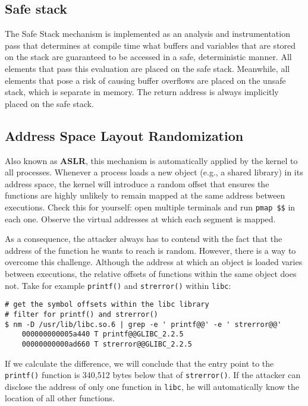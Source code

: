 \subsection{Safe stack}

The Safe Stack \cite{kuznetzov2018code} mechanism is implemented as an analysis
and instrumentation pass that determines at compile time what buffers and
variables that are stored on the stack are guaranteed to be accessed in a safe,
deterministic manner. All elements that pass this evaluation are placed on the
safe stack. Meanwhile, all elements that pose a risk of causing buffer overflows
are placed on the unsafe stack, which is separate in memory. The return address
is always implicitly placed on the safe stack.

\subsection{Address Space Layout Randomization}

Also known as \textbf{ASLR}, this mechanism is automatically applied by the
kernel to all processes. Whenever a process loads a new object (e.g., a shared
library) in its address space, the kernel will introduce a random offset that
ensures the functions are highly unlikely to remain mapped at the same address
between executions. Check this for yourself: open multiple terminals and run
\texttt{pmap \$\$} in each one. Observe the virtual addresses at which each
segment is mapped.

As a consequence, the attacker always has to contend with the fact that the
address of the function he wants to reach is random. However, there is a way to
overcome this challenge. Although the address at which an object is loaded
varies between executions, the relative offsets of functions within the same
object does not. Take for example \texttt{printf()} and \texttt{strerror()}
within \texttt{libc}:

\begin{lstlisting}[style=bashstyle]
# get the symbol offsets within the libc library
# filter for printf() and strerror()
$ nm -D /usr/lib/libc.so.6 | grep -e ' printf@@' -e ' strerror@@'
    000000000005a440 T printf@@GLIBC_2.2.5
    00000000000ad660 T strerror@@GLIBC_2.2.5
\end{lstlisting}

If we calculate the difference, we will conclude that the entry point to the
\texttt{printf()} function is 340,512 bytes below that of \texttt{strerror()}.
If the attacker can disclose the address of only one function in \texttt{libc},
he will automatically know the location of all other functions.

